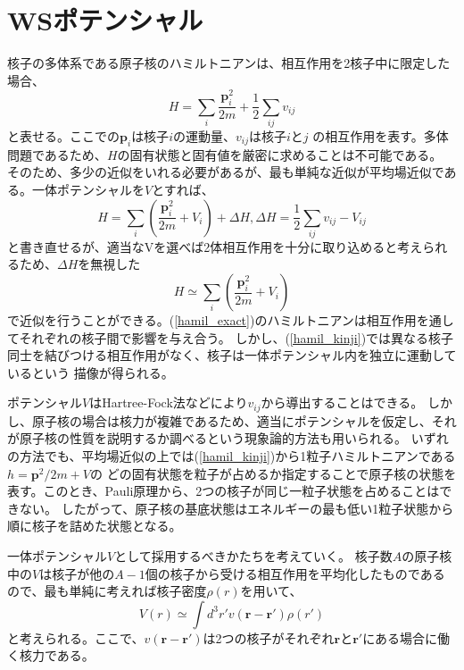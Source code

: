 \documentclass[a4paper]{jsreport}
\begin{document}
  \section{WSポテンシャル}
  核子の多体系である原子核のハミルトニアンは、相互作用を2核子中に限定した場合、
  \begin{equation}
    H=\sum_{i}\frac{\bm{p}_i^2}{2m} + \frac{1}{2}\sum_{ij}v_{ij}
  \end{equation}
  と表せる。ここでの\(\bm{p}_i\)は核子\(i\)の運動量、\(v_{ij}\)は核子\(i\)と\(j\)
  の相互作用を表す。多体問題であるため、\(H\)の固有状態と固有値を厳密に求めることは不可能である。
  そのため、多少の近似をいれる必要があるが、最も単純な近似が平均場近似である。一体ポテンシャルを\(V\)とすれば、
  \begin{equation*}
    H=\sum_{i}\left(\frac{\bm{p}_i^2}{2m}+V_i\right) +\Delta H,\Delta H = \frac{1}{2}\sum_{ij}v_{ij} - V_{ij}
    \label{hamil_exact}
  \end{equation*}
  と書き直せるが、適当なVを選べば2体相互作用を十分に取り込めると考えられるため、\(\Delta H\)を無視した
  \begin{equation}
    H \simeq \sum_{i}\left(\frac{\bm{p}_i^2}{2m}+V_i\right)
    \label{hamil_kinji}
  \end{equation}
  で近似を行うことができる。(\ref{hamil_exact})のハミルトニアンは相互作用を通してそれぞれの核子間で影響を与え合う。
  しかし、(\ref{hamil_kinji})では異なる核子同士を結びつける相互作用がなく、核子は一体ポテンシャル内を独立に運動しているという
  描像が得られる。\par
  ポテンシャル\(V\)はHartree-Fock法などにより\(v_{ij}\)から導出することはできる。
  しかし、原子核の場合は核力が複雑であるため、適当にポテンシャルを仮定し、それが原子核の性質を説明するか調べるという現象論的方法も用いられる。
  いずれの方法でも、平均場近似の上では(\ref{hamil_kinji})から1粒子ハミルトニアンである\(h=\bm{p}^2/2m+V\)の
  どの固有状態を粒子が占めるか指定することで原子核の状態を表す。このとき、Pauli原理から、2つの核子が同じ一粒子状態を占めることはできない。
  したがって、原子核の基底状態はエネルギーの最も低い1粒子状態から順に核子を詰めた状態となる。\par
  一体ポテンシャル\(V\)として採用するべきかたちを考えていく。
  核子数\(A\)の原子核中の\(V\)は核子が他の\(A-1\)個の核子から受ける相互作用を平均化したものであるので、最も単純に考えれば核子密度\(\rho(r)\)を用いて、
  \begin{equation*}
    V(r)\simeq\int d^3r' v(\bm{r}-\bm{r}')\rho(r')
  \end{equation*}
  と考えられる。ここで、\(v(\bm{r}-\bm{r}')\)は2つの核子がそれぞれ\(\bm{r}\)と\(\bm{r}'\)にある場合に働く核力である。
\end{document}
